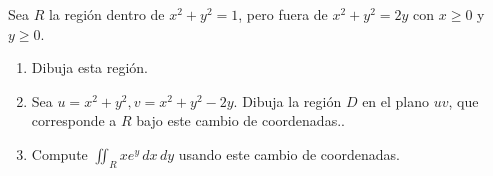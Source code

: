 Sea \( R \) la región dentro de \( x^2 + y^2 = 1 \), pero fuera de \( x^2 + y^2 = 2y \) con \( x \geq 0 \) y \( y \geq 0 \).
\begin{enumerate}[label={(\alph*)}]
	\item Dibuja esta región.
	\item Sea $u = x^2 + y^2, v = x^2 + y^2 - 2y$. Dibuja la región $D$ en el plano $uv$, que corresponde a $R$ bajo este cambio de coordenadas..
	\item Compute $\displaystyle\iint_R xe^y\, dx\, dy$ usando este cambio de coordenadas.
\end{enumerate}
